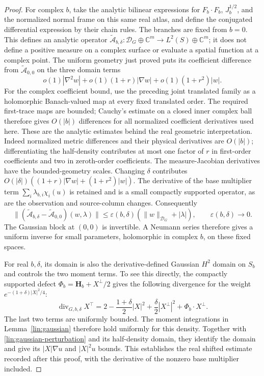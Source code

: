 \begin{proof}
For complex $b$, take the analytic bilinear expressions for $F_b\cdot F_b$,
$J_b^{1/2}$, and the normalized normal frame on this same real atlas, and define
the conjugated differential expression by their chain rules.  The branches
are fixed from $b=0$.  This defines an analytic operator
$\widetilde{\mathcal A}_{b,\delta}:\mathcal D_G\oplus\mathbb C^m
\to L^2(S)\oplus\mathbb C^m$; it does not define a positive measure
on a complex surface or evaluate a spatial function at a complex point.
The uniform geometry just proved puts its coefficient difference from
$\widetilde{\mathcal A}_{0,0}$ on the three domain terms
\[
 o(1)|\nabla^2w|+
 o(1)(1+r)|\nabla w|+
 o(1)(1+r^2)|w|.
\]
For the complex coefficient bound, use the preceding joint translated
family as a holomorphic Banach-valued map at every fixed translated order.
The required first-trace maps are bounded; Cauchy's estimate on a closed
inner complex ball therefore gives $O(|b|)$ differences for all normalized
coefficient derivatives used here.  These are the analytic estimates
behind the real geometric interpretation.
Indeed normalized metric differences and their physical derivatives are
$O(|b|)$; differentiating the half-density contributes at most one factor
of $r$ in first-order coefficients and two in zeroth-order coefficients.
The measure-Jacobian derivatives have the bounded-geometry scales.
Changing $\delta$ contributes
$O(|\delta|)((1+r)|\nabla w|+(1+r^2)|w|)$.
The derivative of the base multiplier term
$\sum_i\lambda_{b,i}\chi_i(u)$ is retained and is a small compactly
supported operator, as are the observation and source-column changes.
Consequently
\begin{equation}\label{lin:gaussian-perturbation}
 \|(\widetilde{\mathcal A}_{b,\delta}
       -\widetilde{\mathcal A}_{0,0})(w,\lambda)\|
 \le \varepsilon(b,\delta)(\|w\|_{\mathcal D_G}+|\lambda|),
 \qquad \varepsilon(b,\delta)\longrightarrow0.
\end{equation}
The Gaussian block at $(0,0)$ is invertible.  A Neumann series therefore
gives a uniform inverse for small parameters, holomorphic in complex $b$,
on these fixed spaces.

For real $b,\delta$, its domain is also the derivative-defined Gaussian
$H^2$ domain on $S_b$ and controls the two moment terms.  To see this
directly, the compactly supported defect
$\Phi_b=\mathbf H_b+X^\perp/2$ gives the following divergence for the
weight $e^{-(1+\delta)|X|^2/4}$:
\[
 \operatorname{div}_{G,b,\delta}X^\top
 =2-\frac{1+\delta}{2}|X|^2+
       \frac{\delta}{2}|X^\perp|^2+\Phi_b\cdot X^\perp.
\]
The last two terms are uniformly bounded.  The moment integrations in
Lemma~\ref{lin:gaussian} therefore hold uniformly for this density.
Together with \eqref{lin:gaussian-perturbation} and its half-density
domain, they identify the domain and give its $|X|\nabla u$ and
$|X|^2u$ bounds.  This establishes the real shifted estimate recorded
after this proof, with the derivative of the nonzero base multiplier
included.


\end{proof}
